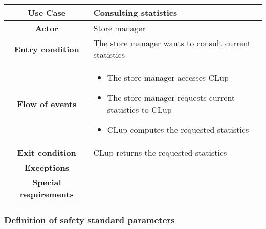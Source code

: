 \documentclass[../../main.tex]{subfiles}
\begin{document}
      \begin{table}[H]
        \centering
          \begin{tabular}{c m{}}
          \hline
          \textbf{Use Case} & Consulting statistics\\ \hline
          \textbf{Actor} & Store manager\\ \hline
          \textbf{Entry condition} & The store manager wants to consult current statistics\\  \hline
          \textbf{Flow of events} & \begin{itemize}
                                      \item The store manager accesses CLup
                                      \item The store manager requests current statistics to CLup
                                      \item CLup computes the requested statistics
                                    \end{itemize}\\ \hline
          \textbf{Exit condition} & CLup returns the requested statistics \\ \hline
          \textbf{Exceptions} & \\ \hline
          \textbf{Special requirements} &\\ \hline
          \end{tabular}
      \end{table}


      \subsubsection{Definition of safety standard parameters} %
\end{document}
